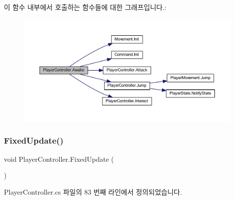 이 함수 내부에서 호출하는 함수들에 대한 그래프입니다.\+:\nopagebreak
\begin{figure}[H]
\begin{center}
\leavevmode
\includegraphics[width=350pt]{dc/dde/class_player_controller_a050967f0e5c2340cb21861e4c8c788a1_cgraph}
\end{center}
\end{figure}
\mbox{\label{class_player_controller_ae5bdb1b48571f67c3f722a58b6f404d4}} 
\subsubsection{\texorpdfstring{FixedUpdate()}{FixedUpdate()}}
{\footnotesize\ttfamily void Player\+Controller.\+Fixed\+Update (\begin{DoxyParamCaption}{ }\end{DoxyParamCaption})\hspace{0.3cm}{\ttfamily [private]}}



Player\+Controller.\+cs 파일의 83 번째 라인에서 정의되었습니다.


